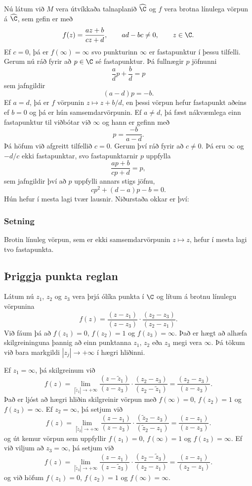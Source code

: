 Nú látum við $M$ vera útvíkkaða talnaplanið $\widehat \C$ og $f$ vera
brotna línulega vörpun á $\widehat \C$, sem gefin er með
$$
f(z)=\dfrac{az+b}{cz+d}, \qquad ad-bc\neq 0, \qquad z\in \C.
$$
Ef $c=0$, þá er $f(\infty)=\infty$ svo punkturinn $\infty$ er
fastapunktur í þessu tilfelli.  Gerum nú ráð fyrir að $p\in \C$ sé
fastapunktur. Þá fullnægir $p$ jöfnunni
$$
\dfrac ad p+\dfrac bd=p 
$$
sem jafngildir 
$$
(a-d)p=-b.
$$
Ef $a=d$, þá er $f$ vörpunin $z\mapsto z+b/d$, en þessi vörpun hefur
fastapunkt aðeins ef $b=0$ og  þá er hún samsemdarvörpunin.
Ef $a\neq d$, þá fæst nákvæmlega einn fastapunktur til viðbótar við
$\infty$ og hann er gefinn með
$$
p=\dfrac {-b}{a-d}.
$$
Þá höfum við afgreitt tilfellið $c=0$.  Gerum því ráð fyrir að $c\neq
0$.  Þá eru $\infty$ og $-d/c$ ekki fastapunktar, svo fastapunktarnir
$p$ uppfylla 
$$
\dfrac{ap+b}{cp+d}=p,
$$
sem jafngildir því að $p$ uppfylli annars stigs jöfnu,
$$
cp^2+(d-a)p-b=0.
$$
Hún hefur í mesta lagi tvær lausnir.  Niðurstaða okkar er því:

\subsubsection{Setning}\label{se:fastapunktar}
Brotin línuleg vörpun, sem er ekki samsemdarvörpunin $z\mapsto z$,
hefur í mesta lagi tvo fastapunkta. 


\subsection*{Þriggja punkta reglan}

Látum nú $z_1$, $z_2$ og $z_3$ vera þrjá ólíka punkta í $\C$ og lítum
á brotnu línulegu vörpunina
$$
f(z)=\dfrac{(z-z_1)}{(z-z_3)}\cdot \dfrac{(z_2-z_3)}{(z_2-z_1)}.
$$
Við fáum þá að $f(z_1)=0$, $f(z_2)=1$ og $f(z_3)=\infty$.   Það er
hægt að alhæfa skilgreininguna þannig að einn punktanna $z_1$, $z_2$
eða $z_3$ megi vera $\infty$.  Þá tökum við bara markgildi $|z_j|\to
+\infty$ í hægri hliðinni.    

Ef $z_1=\infty$, þá skilgreinum við
$$
f(z)=\lim_{|\tilde z_1|\to+\infty}
\dfrac{(z-\tilde z_1)}{(z-z_3)}\cdot \dfrac{(z_2-z_3)}{(z_2-\tilde
z_1)}
=\dfrac {(z_2-z_3)}{(z-z_3)}.
$$
Það er ljóst að hægri hliðin skilgreinir vörpun með
$f(\infty)=0$, $f(z_2)=1$ og $f(z_3)=\infty$.
Ef $z_2=\infty$, þá setjum við 
$$
f(z)=\lim_{|\tilde z_2|\to+\infty}
\dfrac{(z-z_1)}{(z-z_3)}\cdot \dfrac{(\tilde z_2-z_3)}{(\tilde z_2-
z_1)}
=\dfrac {(z-z_1)}{(z-z_3)}.
$$
og út kemur vörpun sem uppfyllir $f(z_1)=0$, $f(\infty)=1$ og
$f(z_3)=\infty$.  Ef við viljum að $z_3=\infty$, þá setjum við
$$
f(z)=\lim_{|\tilde z_3|\to+\infty}
\dfrac{(z-z_1)}{(z-\tilde z_3)}\cdot \dfrac{( z_2-\tilde z_3)}{(z_2-
z_1)}
=\dfrac {(z-z_1)}{(z_2-z_1)}.
$$
og við höfum $f(z_1)=0$, $f(z_2)=1$ og $f(\infty)=\infty$.


